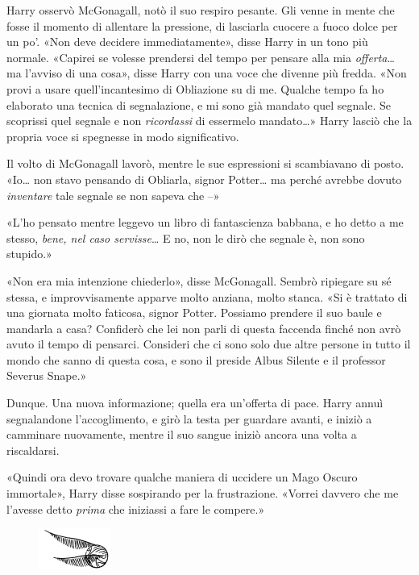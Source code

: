 Harry osservò McGonagall, notò il suo respiro pesante. Gli venne in mente che fosse il momento di allentare la pressione, di lasciarla cuocere a fuoco dolce per un po’. «Non deve decidere immediatamente», disse Harry in un tono più normale. «Capirei se volesse prendersi del tempo per pensare alla mia \textit{offerta}… ma l’avviso di una cosa», disse Harry con una voce che divenne più fredda. «Non provi a usare quell’incantesimo di Obliazione su di me. Qualche tempo fa ho elaborato una tecnica di segnalazione, e mi sono già mandato quel segnale. Se scoprissi quel segnale e non \textit{ricordassi} di essermelo mandato…» Harry lasciò che la propria voce si spegnesse in modo significativo.

Il volto di McGonagall lavorò, mentre le sue espressioni si scambiavano di posto. «Io… non stavo pensando di Obliarla, signor Potter… ma perché avrebbe dovuto \textit{inventare} tale segnale se non sapeva che –»

«L’ho pensato mentre leggevo un libro di fantascienza babbana, e ho detto a me stesso, \textit{bene, nel caso servisse}… E no, non le dirò che segnale è, non sono stupido.»

«Non era mia intenzione chiederlo», disse McGonagall. Sembrò ripiegare su sé stessa, e improvvisamente apparve molto anziana, molto stanca. «Si è trattato di una giornata molto faticosa, signor Potter. Possiamo prendere il suo baule e mandarla a casa? Confiderò che lei non parli di questa faccenda finché non avrò avuto il tempo di pensarci. Consideri che ci sono solo due altre persone in tutto il mondo che sanno di questa cosa, e sono il preside Albus Silente e il professor Severus Snape.»

Dunque. Una nuova informazione; quella era un’offerta di pace. Harry annuì segnalandone l’accoglimento, e girò la testa per guardare avanti, e iniziò a camminare nuovamente, mentre il suo sangue iniziò ancora una volta a riscaldarsi.

«Quindi ora devo trovare qualche maniera di uccidere un Mago Oscuro immortale», Harry disse sospirando per la frustrazione. «Vorrei davvero che me l’avesse detto \textit{prima} che iniziassi a fare le compere.»

\begin{figure}[h]
	\includegraphics[scale=0.4]{boccino.png}
	\centering
\end{figure}

